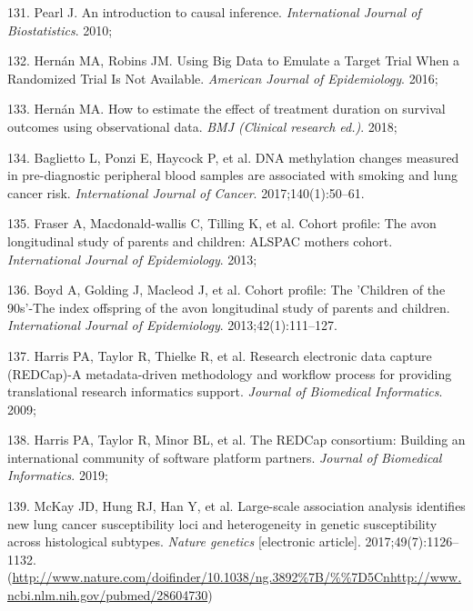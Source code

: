 \documentclass[11pt,oneside]{bristolthesis}
\newenvironment{cslreferences}%
  {}%
  {\par}
\begin{document}
\begin{cslreferences}
\leavevmode\hypertarget{ref-Pearl2010}{}%
131. Pearl J. An introduction to causal inference. \emph{International Journal of Biostatistics}. 2010;

\leavevmode\hypertarget{ref-Hernan2016}{}%
132. Hernán MA, Robins JM. Using Big Data to Emulate a Target Trial When a Randomized Trial Is Not Available. \emph{American Journal of Epidemiology}. 2016;

\leavevmode\hypertarget{ref-Hernan2018}{}%
133. Hernán MA. How to estimate the effect of treatment duration on survival outcomes using observational data. \emph{BMJ (Clinical research ed.)}. 2018;

\leavevmode\hypertarget{ref-Baglietto2017}{}%
134. Baglietto L, Ponzi E, Haycock P, et al. DNA methylation changes measured in pre-diagnostic peripheral blood samples are associated with smoking and lung cancer risk. \emph{International Journal of Cancer}. 2017;140(1):50--61.

\leavevmode\hypertarget{ref-Fraser2013}{}%
135. Fraser A, Macdonald-wallis C, Tilling K, et al. Cohort profile: The avon longitudinal study of parents and children: ALSPAC mothers cohort. \emph{International Journal of Epidemiology}. 2013;

\leavevmode\hypertarget{ref-Boyd2013}{}%
136. Boyd A, Golding J, Macleod J, et al. Cohort profile: The 'Children of the 90s'-The index offspring of the avon longitudinal study of parents and children. \emph{International Journal of Epidemiology}. 2013;42(1):111--127.

\leavevmode\hypertarget{ref-Harris2009}{}%
137. Harris PA, Taylor R, Thielke R, et al. Research electronic data capture (REDCap)-A metadata-driven methodology and workflow process for providing translational research informatics support. \emph{Journal of Biomedical Informatics}. 2009;

\leavevmode\hypertarget{ref-Harris2019}{}%
138. Harris PA, Taylor R, Minor BL, et al. The REDCap consortium: Building an international community of software platform partners. \emph{Journal of Biomedical Informatics}. 2019;

\leavevmode\hypertarget{ref-McKay2017}{}%
139. McKay JD, Hung RJ, Han Y, et al. Large-scale association analysis identifies new lung cancer susceptibility loci and heterogeneity in genetic susceptibility across histological subtypes. \emph{Nature genetics} {[}electronic article{]}. 2017;49(7):1126--1132. (\url{http://www.nature.com/doifinder/10.1038/ng.3892\%7B/\%\%7D5Cnhttp://www.ncbi.nlm.nih.gov/pubmed/28604730})


\end{cslreferences}
\end{document}
